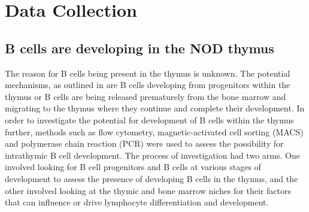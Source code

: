 
\chapter{Data Collection}




\section{B cells are developing in the NOD thymus}
The reason for B cells being present in the thymus is unknown. 
The potential mechanisms, as outlined in  are B cells developing from progenitors within the thymus or B cells are being released prematurely from the bone marrow and migrating to the thymus where they continue and complete their development.
In order to investigate the potential for development of B cells within the thymus further, methods such as flow cytometry, magnetic-activated cell sorting (MACS) and polymerase chain reaction (PCR) were used to assess the possibility for intrathymic B cell development.
The process of investigation had two arms.
One involved looking for B cell progenitors and B cells at various stages of development to assess the presence of developing B cells in the thymus, and the other involved looking at the thymic and bone marrow niches for their factors that can influence or drive lymphocyte differentiation and development.



